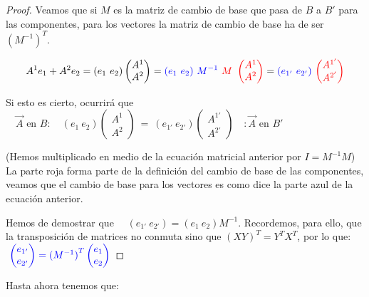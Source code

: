 \begin{proof}
Veamos que si $M$ es la matriz de cambio de base que pasa de $B$ a $B'$ para las componentes, para los vectores	la matriz de cambio de base ha de ser ${(M^{-1})}^T$.


$$A^1e_1+A^2e_2 = ( e_1 \ e_2) \left( \begin{matrix} A^{1} \\ A^{2} \end{matrix} \right)  = 
\textcolor{blue}{ ( e_1 \ e_2) \ M^{-1}} \ \textcolor{red}{ M \ \left( \begin{matrix} A^{1} \\ A^{2} \end{matrix} \right)} = \textcolor{blue}{ ( e_{1'} \ e_{2'})} \ \textcolor{red} { \left( \begin{matrix} A^{1'} \\ A^{2'} \end{matrix} \right) }$$

Si esto es cierto, ocurrirá que $\quad \overrightarrow A \text{ en }B:\quad 
( e_1 \ e_2) \left( \begin{matrix} A^{1} \\ A^{2} \end{matrix} \right)
\ \boldsymbol{=} \ 
( e_{1'} \ e_{2'}) \left( \begin{matrix} A^{1'} \\ A^{2'} \end{matrix} \right) \quad : \overrightarrow A \text{ en }B'$

\textcolor{gris}{(Hemos multiplicado en medio de la ecuación matricial anterior por $I=M^{-1}M$)} La parte roja forma parte de la definición del cambio de base de las componentes, veamos que el cambio de base para los vectores es como dice la parte azul de la ecuación anterior.

Hemos de demostrar que $\quad (e_{1'} \ e_{2'})=(e_{1} \ e_{2})M^{-1}$. Recordemos, para ello, que la transposición de  matrices no conmuta sino que ${(XY)}^T=Y^TX^T$, por lo que:
$\textcolor{blue}{ \  \left( \begin{matrix}  e_{1'} \\ e_{2'} \end{matrix} \right) = {(M^{-1})}^T \left(  \begin{matrix}  e_{1} \\ e_{2} \end{matrix} \right) }$
\end{proof}

Hasta ahora tenemos que:

